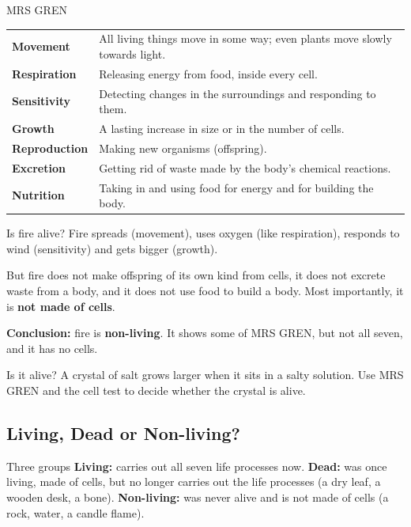 \begin{skillbox}{MRS GREN}
\renewcommand{\arraystretch}{1.15}
\begin{tabular}{@{}p{2.4cm}p{7.3cm}@{}}
\textbf{Movement} & All living things move in some way; even plants move slowly towards light. \\
\textbf{Respiration} & Releasing energy from food, inside every cell. \\
\textbf{Sensitivity} & Detecting changes in the surroundings and responding to them. \\
\textbf{Growth} & A lasting increase in size or in the number of cells. \\
\textbf{Reproduction} & Making new organisms (offspring). \\
\textbf{Excretion} & Getting rid of waste made by the body's chemical reactions. \\
\textbf{Nutrition} & Taking in and using food for energy and for building the body. \\
\end{tabular}
\end{skillbox}

\begin{workedex}{Is fire alive?}
Fire spreads (movement), uses oxygen (like respiration), responds to wind (sensitivity) and gets bigger (growth).

\smallskip
But fire does not make offspring of its own kind from cells, it does not excrete waste from a body, and it does not use food to build a body. Most importantly, it is \textbf{not made of cells}.

\smallskip
\textbf{Conclusion:} fire is \textbf{non-living}. It shows some of MRS GREN, but not all seven, and it has no cells.
\end{workedex}

\begin{wedo}{Is it alive?}
A crystal of salt grows larger when it sits in a salty solution. Use MRS GREN and the cell test to decide whether the crystal is alive.
\answerbox{5cm}
\end{wedo}

\subsection{Living, Dead or Non-living?}\label{sub:1.2}

\begin{skillbox}{Three groups}
\textbf{Living:} carries out all seven life processes now. \quad \textbf{Dead:} was once living, made of cells, but no longer carries out the life processes (a dry leaf, a wooden desk, a bone). \quad \textbf{Non-living:} was never alive and is not made of cells (a rock, water, a candle flame).
\end{skillbox}

